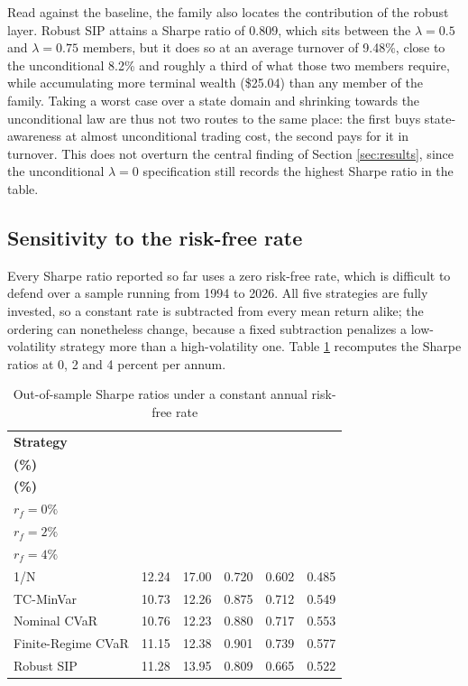 \documentclass[smallcondensed]{svjour3}
\begin{document}
Read against the baseline, the family also locates the contribution of the robust layer. Robust SIP attains a Sharpe ratio of 0.809, which sits between the $\lambda = 0.5$ and $\lambda = 0.75$ members, but it does so at an average turnover of 9.48\%, close to the unconditional 8.2\% and roughly a third of what those two members require, while accumulating more terminal wealth (\$25.04) than any member of the family. Taking a worst case over a state domain and shrinking towards the unconditional law are thus not two routes to the same place: the first buys state-awareness at almost unconditional trading cost, the second pays for it in turnover. This does not overturn the central finding of Section \ref{sec:results}, since the unconditional $\lambda = 0$ specification still records the highest Sharpe ratio in the table.

\subsection{Sensitivity to the risk-free rate}\label{sec:riskfree}
Every Sharpe ratio reported so far uses a zero risk-free rate, which is difficult to defend over a sample running from 1994 to 2026. All five strategies are fully invested, so a constant rate is subtracted from every mean return alike; the ordering can nonetheless change, because a fixed subtraction penalizes a low-volatility strategy more than a high-volatility one. Table \ref{tab:riskfree} recomputes the Sharpe ratios at 0, 2 and 4 percent per annum.

\begin{table}[!htbp]
\centering
\caption{Out-of-sample Sharpe ratios under a constant annual risk-free rate}
\label{tab:riskfree}
\small
\begin{tabular}{lrrrrr}
\toprule
\textbf{Strategy} & \makecell[r]{\textbf{Ret.}\\\textbf{(\%)}} & \makecell[r]{\textbf{Vol.}\\\textbf{(\%)}} & \makecell[r]{\textbf{Sharpe}\\$r_f=0\%$} & \makecell[r]{\textbf{Sharpe}\\$r_f=2\%$} & \makecell[r]{\textbf{Sharpe}\\$r_f=4\%$} \\
\midrule
1/N & 12.24 & 17.00 & 0.720 & 0.602 & 0.485 \\
TC-MinVar & 10.73 & 12.26 & 0.875 & 0.712 & 0.549 \\
Nominal CVaR & 10.76 & 12.23 & 0.880 & 0.717 & 0.553 \\
Finite-Regime CVaR & 11.15 & 12.38 & 0.901 & 0.739 & 0.577 \\
Robust SIP & 11.28 & 13.95 & 0.809 & 0.665 & 0.522 \\
\bottomrule
\end{tabular}
\end{table}
\end{document}
